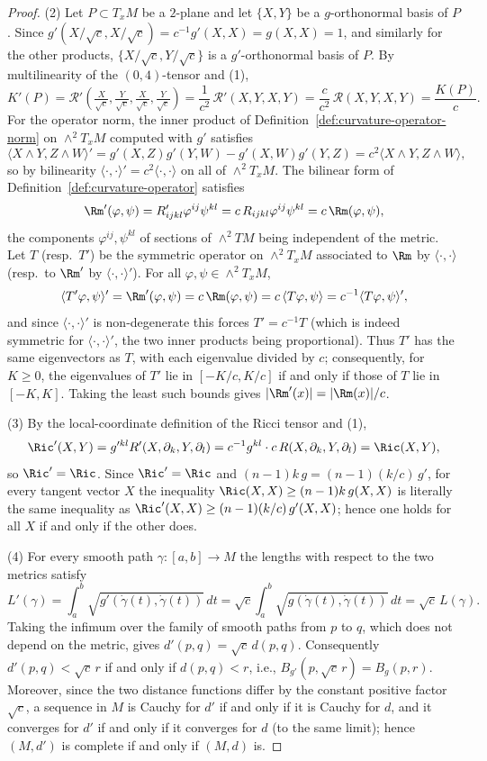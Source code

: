 \begin{proof}
(2) Let $P\subset T_xM$ be a $2$-plane and let $\{X,Y\}$ be a
$g$-orthonormal basis of $P$. Since $g'(X/\sqrt{c},X/\sqrt{c})
=c^{-1}g'(X,X)=g(X,X)=1$, and similarly for the other products,
$\{X/\sqrt{c},Y/\sqrt{c}\}$ is a $g'$-orthonormal basis of $P$.
By multilinearity of the $(0,4)$-tensor and (1),
$$K'(P)={\mathcal R}'\!\left(\tfrac{X}{\sqrt{c}},
\tfrac{Y}{\sqrt{c}},\tfrac{X}{\sqrt{c}},\tfrac{Y}{\sqrt{c}}\right)
=\frac{1}{c^2}\,{\mathcal R}'(X,Y,X,Y)
=\frac{c}{c^2}\,{\mathcal R}(X,Y,X,Y)=\frac{K(P)}{c}.$$
For the operator norm, the inner product of
Definition~\ref{def:curvature-operator-norm} on $\wedge^2T_xM$
computed with $g'$ satisfies
$$\langle X\wedge Y,Z\wedge W\rangle'
=g'(X,Z)g'(Y,W)-g'(X,W)g'(Y,Z)
=c^2\langle X\wedge Y,Z\wedge W\rangle,$$
so by bilinearity $\langle\cdot,\cdot\rangle'
=c^2\langle\cdot,\cdot\rangle$ on all of $\wedge^2T_xM$. The
bilinear form of Definition~\ref{def:curvature-operator} satisfies
$$\Rm'(\varphi,\psi)=R'_{ijkl}\varphi^{ij}\psi^{kl}
=c\,R_{ijkl}\varphi^{ij}\psi^{kl}=c\,\Rm(\varphi,\psi),$$
the components $\varphi^{ij},\psi^{kl}$ of sections of
$\wedge^2TM$ being independent of the metric. Let $T$ (resp.\ $T'$)
be the symmetric operator on $\wedge^2T_xM$ associated to $\Rm$ by
$\langle\cdot,\cdot\rangle$ (resp.\ to $\Rm'$ by
$\langle\cdot,\cdot\rangle'$). For all
$\varphi,\psi\in\wedge^2T_xM$,
$$\langle T'\varphi,\psi\rangle'=\Rm'(\varphi,\psi)
=c\,\Rm(\varphi,\psi)=c\,\langle T\varphi,\psi\rangle
=c^{-1}\langle T\varphi,\psi\rangle',$$
and since $\langle\cdot,\cdot\rangle'$ is non-degenerate this
forces $T'=c^{-1}T$ (which is indeed symmetric for
$\langle\cdot,\cdot\rangle'$, the two inner products being
proportional). Thus $T'$ has the same eigenvectors as $T$, with
each eigenvalue divided by $c$; consequently, for $K\ge0$, the
eigenvalues of $T'$ lie in $[-K/c,K/c]$ if and only if those of
$T$ lie in $[-K,K]$. Taking the least such bounds gives
$|\Rm'(x)|=|\Rm(x)|/c$.

(3) By the local-coordinate definition of the Ricci tensor and (1),
$$\Ric'(X,Y)=g'^{kl}R'(X,\partial_k,Y,\partial_l)
=c^{-1}g^{kl}\cdot c\,R(X,\partial_k,Y,\partial_l)=\Ric(X,Y),$$
so $\Ric'=\Ric$. Since $\Ric'=\Ric$ and
$(n-1)k\,g=(n-1)(k/c)\,g'$, for every tangent vector $X$ the
inequality $\Ric(X,X)\ge(n-1)k\,g(X,X)$ is literally the same
inequality as $\Ric'(X,X)\ge(n-1)(k/c)\,g'(X,X)$; hence one holds
for all $X$ if and only if the other does.

(4) For every smooth path $\gamma\colon[a,b]\to M$ the lengths with
respect to the two metrics satisfy
$$L'(\gamma)=\int_a^b\sqrt{g'(\dot\gamma(t),\dot\gamma(t))}\,dt
=\sqrt{c}\int_a^b\sqrt{g(\dot\gamma(t),\dot\gamma(t))}\,dt
=\sqrt{c}\,L(\gamma).$$
Taking the infimum over the family of smooth paths from $p$ to $q$,
which does not depend on the metric, gives
$d'(p,q)=\sqrt{c}\,d(p,q)$. Consequently $d'(p,q)<\sqrt{c}\,r$ if
and only if $d(p,q)<r$, i.e.,
$B_{g'}(p,\sqrt{c}\,r)=B_g(p,r)$. Moreover, since the two distance
functions differ by the constant positive factor $\sqrt{c}$, a
sequence in $M$ is Cauchy for $d'$ if and only if it is Cauchy for
$d$, and it converges for $d'$ if and only if it converges for
$d$ (to the same limit); hence $(M,d')$ is complete if and only if
$(M,d)$ is.


\end{proof}
